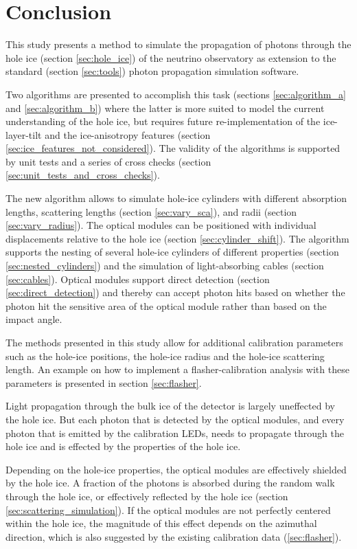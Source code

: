 
\section{Conclusion}
\label{sec:conclusion}

This study presents a method to simulate the propagation of photons through the hole ice (section \ref{sec:hole_ice}) of the \icecube neutrino observatory as extension to the standard \clsim (section \ref{sec:tools}) photon propagation simulation software.

Two algorithms are presented to accomplish this task (sections \ref{sec:algorithm_a} and \ref{sec:algorithm_b}) where the latter is more suited to model the current understanding of the hole ice, but requires future re-implementation of the ice-layer-tilt and the ice-anisotropy features (section \ref{sec:ice_features_not_considered}). The validity of the algorithms is supported by unit tests and a series of cross checks (section \ref{sec:unit_tests_and_cross_checks}).

The new algorithm allows to simulate hole-ice cylinders with different absorption lengths, scattering lengths (section \ref{sec:vary_sca}), and radii (section \ref{sec:vary_radius}). The optical modules can be positioned with individual displacements relative to the hole ice (section \ref{sec:cylinder_shift}). The algorithm supports the nesting of several hole-ice cylinders of different properties (section \ref{sec:nested_cylinders}) and the simulation of light-absorbing cables (section \ref{sec:cables}). Optical modules support direct detection (section \ref{sec:direct_detection}) and thereby can accept photon hits based on whether the photon hit the sensitive area of the optical module rather than based on the impact angle.

The methods presented in this study allow for additional calibration parameters such as the hole-ice positions, the hole-ice radius and the hole-ice scattering length. An example on how to implement a flasher-calibration analysis with these parameters is presented in section \ref{sec:flasher}.

Light propagation through the bulk ice of the \icecube detector is largely uneffected by the hole ice. But each photon that is detected by the optical modules, and every photon that is emitted by the calibration LEDs, needs to propagate through the hole ice and is effected by the properties of the hole ice.

Depending on the hole-ice properties, the optical modules are effectively shielded by the hole ice. A fraction of the photons is absorbed during the random walk through the hole ice, or effectively reflected by the hole ice (section \ref{sec:scattering_simulation}). If the optical modules are not perfectly centered within the hole ice, the magnitude of this effect depends on the azimuthal direction, which is also suggested by the existing calibration data (\ref{sec:flasher}).

